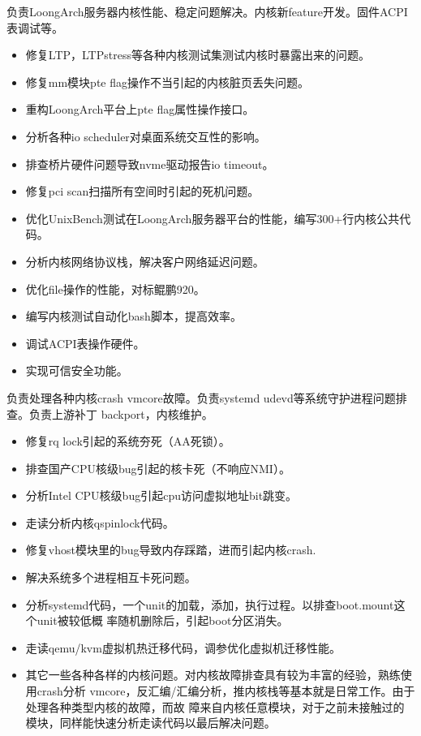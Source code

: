 \documentclass{resume}
\begin{document}
\begin{onehalfspacing}
负责LoongArch服务器内核性能、稳定问题解决。内核新feature开发。固件ACPI表调试等。
\begin{itemize}
  \item 修复LTP，LTPstress等各种内核测试集测试内核时暴露出来的问题。
  \item 修复mm模块pte flag操作不当引起的内核脏页丢失问题。
  \item 重构LoongArch平台上pte flag属性操作接口。
  \item 分析各种io scheduler对桌面系统交互性的影响。
  \item 排查桥片硬件问题导致nvme驱动报告io timeout。
  \item 修复pci scan扫描所有空间时引起的死机问题。
  \item 优化UnixBench测试在LoongArch服务器平台的性能，编写300+行内核公共代码。
  \item 分析内核网络协议栈，解决客户网络延迟问题。
  \item 优化file操作的性能，对标鲲鹏920。
  \item 编写内核测试自动化bash脚本，提高效率。
  \item 调试ACPI表操作硬件。
  \item 实现可信安全功能。
\end{itemize}
\end{onehalfspacing}

\begin{onehalfspacing}
  负责处理各种内核crash vmcore故障。负责systemd udevd等系统守护进程问题排查。负责上游补丁
  backport，内核维护。
  \begin{itemize}
  \item 修复rq lock引起的系统夯死（AA死锁）。
  \item 排查国产CPU核级bug引起的核卡死（不响应NMI）。
  \item 分析Intel CPU核级bug引起cpu访问虚拟地址bit跳变。
  \item 走读分析内核qspinlock代码。
  \item 修复vhost模块里的bug导致内存踩踏，进而引起内核crash.
  \item 解决系统多个进程相互卡死问题。
  \item 分析systemd代码，一个unit的加载，添加，执行过程。以排查boot.mount这个unit被较低概
    率随机删除后，引起boot分区消失。
  \item 走读qemu/kvm虚拟机热迁移代码，调参优化虚拟机迁移性能。
  \item 其它一些各种各样的内核问题。对内核故障排查具有较为丰富的经验，熟练使用crash分析
    vmcore，反汇编/汇编分析，推内核栈等基本就是日常工作。由于处理各种类型内核的故障，而故
    障来自内核任意模块，对于之前未接触过的模块，同样能快速分析走读代码以最后解决问题。
  \end{itemize}
\end{onehalfspacing}
\end{document}
